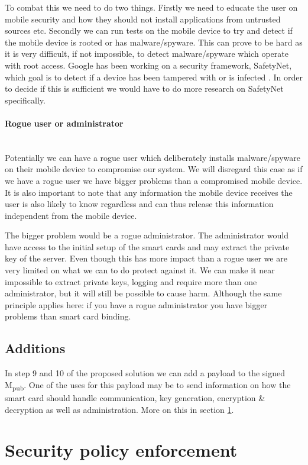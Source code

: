 To combat this we need to do two things. Firstly we need to educate the user on mobile security and how they should not install applications from untrusted sources etc. Secondly we can run tests on the mobile device to try and detect if the mobile device is rooted or has malware/spyware. This can prove to be hard as it is very difficult, if not impossible, to detect malware/spyware which operate with root access. Google has been working on a security framework, SafetyNet, which goal is to detect if a device has been tampered with or is infected \cite{googleSafetynet}. In order to decide if this is sufficient we would have to do more research on SafetyNet specifically.

\paragraph{Rogue user or administrator}\mbox{}\\
Potentially we can have a rogue user which deliberately installs malware/spyware on their mobile device to compromise our system. We will disregard this case as if we have a rogue user we have bigger problems than a compromised mobile device. It is also important to note that any information the mobile device receives the user is also likely to know regardless and can thus release this information independent from the mobile device.

The bigger problem would be a rogue administrator. The administrator would have access to the initial setup of the smart cards and may extract the private key of the server. Even though this has more impact than a rogue user we are very limited on what we can to do protect against it. We can make it near impossible to extract private keys, logging and require more than one administrator, but it will still be possible to cause harm. Although the same principle applies here: if you have a rogue administrator you have bigger problems than smart card binding.


\subsection{Additions}
In step 9 and 10 of the proposed solution we can add a payload to the signed M\textsubscript{pub}. One of the uses for this payload may be to send information on how the smart card should handle communication, key generation, encryption \& decryption as well as administration. More on this in section \ref{sec:policies}.

\section{Security policy enforcement}
\label{sec:policies}

